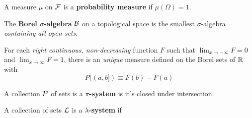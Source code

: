 \documentclass[11pt]{article}
\begin{document}
		
		\begin{definition}
			A measure $\mu$ on $\mathcal{{F}}$ is a \textbf{probability measure} if $\mu(\Omega) = 1$.
		\end{definition}
		
		\begin{definition}
			The \textbf{Borel $\sigma$-algebra} $\mathcal{{B}}$ on a topological space is the smallest $\sigma$-algebra \emph{containing all open sets}.
		\end{definition}
		
		\begin{theorem}
			For each \emph{right continuous, non-decreasing} function $F$ such that $\lim_{x \to -\infty} F = 0$ and $\lim_{x \to \infty} F = 1$, there is an \emph{unique} measure defined on the Borel sets of $\mathbb{R}$ with 
			\begin{equation}
				P((a,b]) \equiv F(b) - F(a)
			\end{equation}
		\end{theorem}
		
		\begin{definition}
			A collection $\mathcal{{P}}$ of sets is a \textbf{$\pi$-system} is it's closed under intersection.
		\end{definition}
		
		\begin{definition}
			A collection of sets $\mathcal{{L}}$ is a \textbf{$\lambda$-system} if
		\end{definition}
\end{document}
